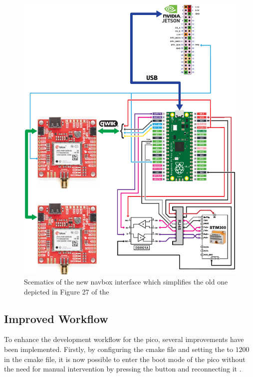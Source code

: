 \begin{figure}[H]
    \centering
    \includegraphics[width=\textwidth]{figures/navbox/navbox_usb.pdf}
    \caption{Scematics of the new \gls{navbox} interface which simplifies the old one depicted in Figure 27 of the \preproject}
    \label{fig:navbox_usb}
\end{figure}

\subsection{Improved Workflow}

To enhance the development workflow for the \gls{pico}, several improvements have been implemented.
Firstly, by configuring the \gls{cmake} file and setting the  to $1200$ in the \gls{cmake} file, it is now possible to enter the boot mode of the \gls{pico} without the need for manual intervention by pressing the  button and reconnecting it \cite{hermannswAnswerSettingUsb2021}.

